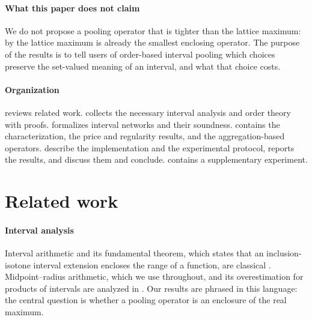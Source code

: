 \documentclass[preprint,12pt]{elsarticle}
\theoremstyle{definition}
\begin{document}
\paragraph{What this paper does not claim} We do not propose a pooling operator that is tighter than the lattice maximum: by  the lattice maximum is already the smallest enclosing operator. The purpose of the results is to tell users of order-based interval pooling which choices preserve the set-valued meaning of an interval, and what that choice costs.

\paragraph{Organization}  reviews related work.  collects the necessary interval analysis and order theory with proofs.  formalizes interval networks and their soundness.  contains the characterization,  the price and regularity results, and  the aggregation-based operators.  describe the implementation and the experimental protocol,  reports the results, and  discuss them and conclude.  contains a supplementary experiment.

\section{Related work}
\label{sec:related}

\paragraph{Interval analysis} Interval arithmetic and its fundamental theorem, which states that an inclusion-isotone interval extension encloses the range of a function, are classical \cite{moore2009}. Midpoint--radius arithmetic, which we use throughout, and its overestimation for products of intervals are analyzed in \cite{rump1999}. Our results are phrased in this language: the central question is whether a pooling operator is an enclosure of the real maximum.
\end{document}
